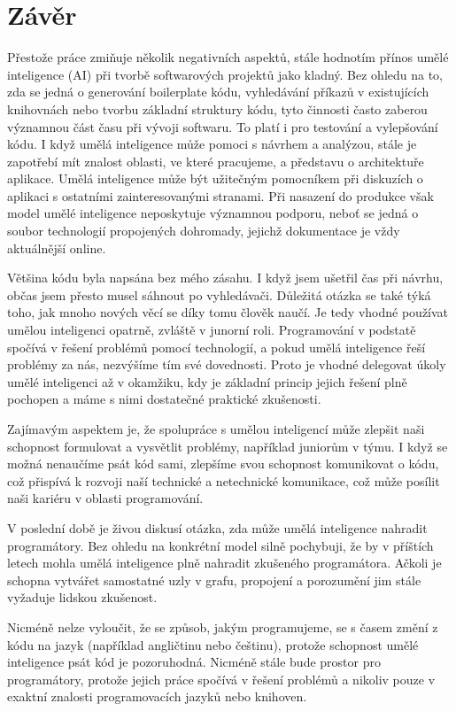 \documentclass[FM,DP]{tulthesis}
\begin{document}
		
		\chapter{Závěr} 
		Přestože práce zmiňuje několik negativních aspektů, stále hodnotím přínos umělé inteligence (AI) při tvorbě softwarových projektů jako kladný. Bez ohledu na to, zda se jedná o generování boilerplate kódu, vyhledávání příkazů v existujících knihovnách nebo tvorbu základní struktury kódu, tyto činnosti často zaberou významnou část času při vývoji softwaru. To platí i pro testování a vylepšování kódu. I když umělá inteligence může pomoci s návrhem a analýzou, stále je zapotřebí mít znalost oblasti, ve které pracujeme, a představu o architektuře aplikace. Umělá inteligence může být užitečným pomocníkem při diskuzích o aplikaci s ostatními zainteresovanými stranami. Při nasazení do produkce však model umělé inteligence neposkytuje významnou podporu, neboť se jedná o soubor technologií propojených dohromady, jejichž dokumentace je vždy aktuálnější online.
		
		Většina kódu byla napsána bez mého zásahu. I když jsem ušetřil čas při návrhu, občas jsem přesto musel sáhnout po vyhledávači. Důležitá otázka se také týká toho, jak mnoho nových věcí se díky tomu člověk naučí. Je tedy vhodné používat umělou inteligenci opatrně, zvláště v junorní roli. Programování v podstatě spočívá v řešení problémů pomocí technologií, a pokud umělá inteligence řeší problémy za nás, nezvýšíme tím své dovednosti. Proto je vhodné delegovat úkoly umělé inteligenci až v okamžiku, kdy je základní princip jejich řešení plně pochopen a máme s nimi dostatečné praktické zkušenosti.
		
		Zajímavým aspektem je, že spolupráce s umělou inteligencí může zlepšit naši schopnost formulovat a vysvětlit problémy, například juniorům v týmu. I když se možná nenaučíme psát kód sami, zlepšíme svou schopnost komunikovat o kódu, což přispívá k rozvoji naší technické a netechnické komunikace, což může posílit naši kariéru v oblasti programování.
		
		V poslední době je živou diskusí otázka, zda může umělá inteligence nahradit programátory. Bez ohledu na konkrétní model silně pochybuji, že by v příštích letech mohla umělá inteligence plně nahradit zkušeného programátora. Ačkoli je schopna vytvářet samostatné uzly v grafu, propojení a porozumění jim stále vyžaduje lidskou zkušenost. 
		
		Nicméně nelze vyloučit, že se způsob, jakým programujeme, se s časem změní z kódu na jazyk (například angličtinu nebo češtinu), protože schopnost umělé inteligence psát kód je pozoruhodná. Nicméně stále bude prostor pro programátory, protože jejich práce spočívá v řešení problémů a nikoliv pouze v exaktní znalosti programovacích jazyků nebo knihoven.
		
		\printbibliography[title={Použitá literatura}] %
	
\end{document}
